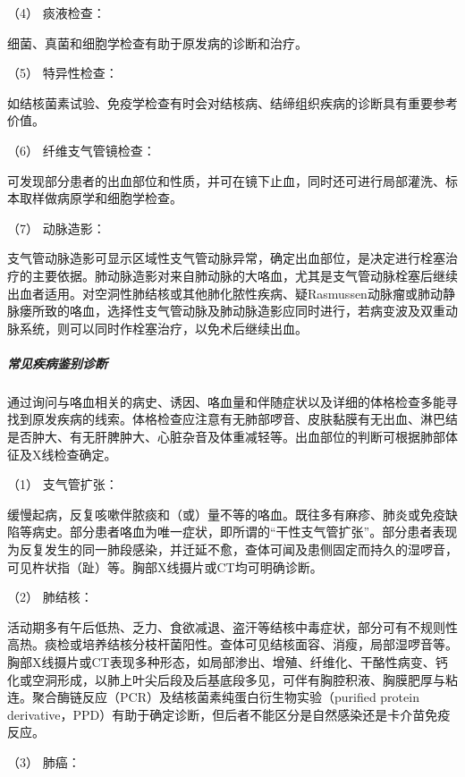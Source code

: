 \hypertarget{text00024.htmlux5cux23CHP1-9-2-4-4}{}
（4） 痰液检查：

细菌、真菌和细胞学检查有助于原发病的诊断和治疗。

\hypertarget{text00024.htmlux5cux23CHP1-9-2-4-5}{}
（5） 特异性检查：

如结核菌素试验、免疫学检查有时会对结核病、结缔组织疾病的诊断具有重要参考价值。

\hypertarget{text00024.htmlux5cux23CHP1-9-2-4-6}{}
（6） 纤维支气管镜检查：

可发现部分患者的出血部位和性质，并可在镜下止血，同时还可进行局部灌洗、标本取样做病原学和细胞学检查。

\hypertarget{text00024.htmlux5cux23CHP1-9-2-4-7}{}
（7） 动脉造影：

支气管动脉造影可显示区域性支气管动脉异常，确定出血部位，是决定进行栓塞治疗的主要依据。肺动脉造影对来自肺动脉的大咯血，尤其是支气管动脉栓塞后继续出血者适用。对空洞性肺结核或其他肺化脓性疾病、疑Rasmussen动脉瘤或肺动静脉瘘所致的咯血，选择性支气管动脉及肺动脉造影应同时进行，若病变波及双重动脉系统，则可以同时作栓塞治疗，以免术后继续出血。

\subparagraph{常见疾病鉴别诊断}

通过询问与咯血相关的病史、诱因、咯血量和伴随症状以及详细的体格检查多能寻找到原发疾病的线索。体格检查应注意有无肺部啰音、皮肤黏膜有无出血、淋巴结是否肿大、有无肝脾肿大、心脏杂音及体重减轻等。出血部位的判断可根据肺部体征及X线检查确定。

\hypertarget{text00024.htmlux5cux23CHP1-9-2-5-1}{}
（1） 支气管扩张：

缓慢起病，反复咳嗽伴脓痰和（或）量不等的咯血。既往多有麻疹、肺炎或免疫缺陷等病史。部分患者咯血为唯一症状，即所谓的“干性支气管扩张”。部分患者表现为反复发生的同一肺段感染，并迁延不愈，查体可闻及患侧固定而持久的湿啰音，可见杵状指（趾）等。胸部X线摄片或CT均可明确诊断。

\hypertarget{text00024.htmlux5cux23CHP1-9-2-5-2}{}
（2） 肺结核：

活动期多有午后低热、乏力、食欲减退、盗汗等结核中毒症状，部分可有不规则性高热。痰检或培养结核分枝杆菌阳性。查体可见结核面容、消瘦，局部湿啰音等。胸部X线摄片或CT表现多种形态，如局部渗出、增殖、纤维化、干酪性病变、钙化或空洞形成，以肺上叶尖后段及后基底段多见，可伴有胸腔积液、胸膜肥厚与粘连。聚合酶链反应（PCR）及结核菌素纯蛋白衍生物实验（purified
protein
derivative，PPD）有助于确定诊断，但后者不能区分是自然感染还是卡介苗免疫反应。

\hypertarget{text00024.htmlux5cux23CHP1-9-2-5-3}{}
（3） 肺癌：

